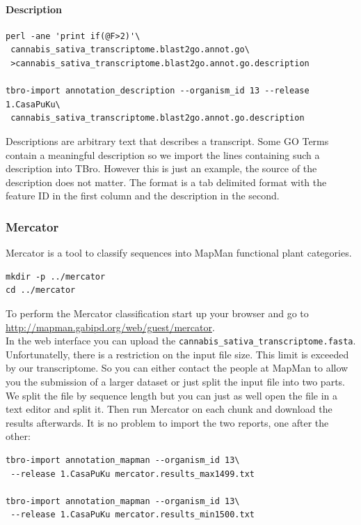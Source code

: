 \documentclass[english]{scrartcl}
\begin{document}
\paragraph{Description}
\quad
\begin{lstlisting}
perl -ane 'print if(@F>2)'\
 cannabis_sativa_transcriptome.blast2go.annot.go\
 >cannabis_sativa_transcriptome.blast2go.annot.go.description

tbro-import annotation_description --organism_id 13 --release 1.CasaPuKu\
 cannabis_sativa_transcriptome.blast2go.annot.go.description
\end{lstlisting}
Descriptions are arbitrary text that describes a transcript. Some GO Terms
contain a meaningful description so we import the lines containing such a
description into TBro. However this is just an example, the source of the
description does not matter. The format is a tab delimited format with the
feature ID in the first column and the description in the second.

\subsubsection{Mercator}
Mercator is a tool to classify sequences into MapMan functional plant categories. 
\begin{lstlisting}
mkdir -p ../mercator
cd ../mercator
\end{lstlisting}
To perform the Mercator classification start up your browser and go to
\url{http://mapman.gabipd.org/web/guest/mercator}.\\
In the web interface you can
upload the \texttt{cannabis\_sativa\_transcriptome.fasta}. Unfortunatelly, there
is a restriction on the input file size. This limit is exceeded by our
transcriptome. So you can either contact the people at MapMan to allow you the
submission of a larger dataset or just split the input file into two parts.
We split the file by sequence length but you can just as well open the file
in a text editor and split it. Then run Mercator on each chunk and download the
results afterwards. It is no problem to import the two reports, one after the
other:
\begin{lstlisting}
tbro-import annotation_mapman --organism_id 13\
 --release 1.CasaPuKu mercator.results_max1499.txt
 
tbro-import annotation_mapman --organism_id 13\
 --release 1.CasaPuKu mercator.results_min1500.txt
\end{lstlisting}
\end{document}
